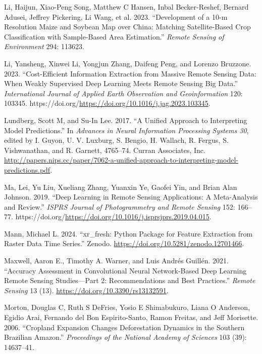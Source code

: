 \documentclass[
]{article}
\newlength{\cslhangindent}
\newlength{\cslentryspacingunit} %
\newenvironment{CSLReferences}[2] %
 {%
  \setlength{\parindent}{0pt}
  \ifodd #1
  \let\oldpar\par
  \def\par{\hangindent=\cslhangindent\oldpar}
  \fi
  \setlength{\parskip}{#2\cslentryspacingunit}
 }%
 {}
\begin{document}
\begin{CSLReferences}{1}{0}
\leavevmode{}%
Li, Haijun, Xiao-Peng Song, Matthew C Hansen, Inbal Becker-Reshef,
Bernard Adusei, Jeffrey Pickering, Li Wang, et al. 2023. {``Development
of a 10-m Resolution Maize and Soybean Map over China: Matching
Satellite-Based Crop Classification with Sample-Based Area
Estimation.''} \emph{Remote Sensing of Environment} 294: 113623.

\leavevmode{}%
Li, Yansheng, Xinwei Li, Yongjun Zhang, Daifeng Peng, and Lorenzo
Bruzzone. 2023. {``Cost-Efficient Information Extraction from Massive
Remote Sensing Data: When Weakly Supervised Deep Learning Meets Remote
Sensing Big Data.''} \emph{International Journal of Applied Earth
Observation and Geoinformation} 120: 103345.
https://doi.org/\url{https://doi.org/10.1016/j.jag.2023.103345}.

\leavevmode{}%
Lundberg, Scott M, and Su-In Lee. 2017. {``A Unified Approach to
Interpreting Model Predictions.''} In \emph{Advances in Neural
Information Processing Systems 30}, edited by I. Guyon, U. V. Luxburg,
S. Bengio, H. Wallach, R. Fergus, S. Vishwanathan, and R. Garnett,
4765--74. Curran Associates, Inc.
\url{http://papers.nips.cc/paper/7062-a-unified-approach-to-interpreting-model-predictions.pdf}.

\leavevmode{}%
Ma, Lei, Yu Liu, Xueliang Zhang, Yuanxin Ye, Gaofei Yin, and Brian Alan
Johnson. 2019. {``Deep Learning in Remote Sensing Applications: A
Meta-Analysis and Review.''} \emph{ISPRS Journal of Photogrammetry and
Remote Sensing} 152: 166--77.
https://doi.org/\url{https://doi.org/10.1016/j.isprsjprs.2019.04.015}.

\leavevmode{}%
Mann, Michael L. 2024. {``{xr\_fresh: Python Package for Feature
Extraction from Raster Data Time Series}.''} Zenodo.
\url{https://doi.org/10.5281/zenodo.12701466}.

\leavevmode{}%
Maxwell, Aaron E., Timothy A. Warner, and Luis Andrés Guillén. 2021.
{``Accuracy Assessment in Convolutional Neural Network-Based Deep
Learning Remote Sensing Studies---Part 2: Recommendations and Best
Practices.''} \emph{Remote Sensing} 13 (13).
\url{https://doi.org/10.3390/rs13132591}.

\leavevmode{}%
Morton, Douglas C, Ruth S DeFries, Yosio E Shimabukuro, Liana O
Anderson, Egidio Arai, Fernando del Bon Espirito-Santo, Ramon Freitas,
and Jeff Morisette. 2006. {``Cropland Expansion Changes Deforestation
Dynamics in the Southern Brazilian Amazon.''} \emph{Proceedings of the
National Academy of Sciences} 103 (39): 14637--41.


\end{CSLReferences}
\end{document}
